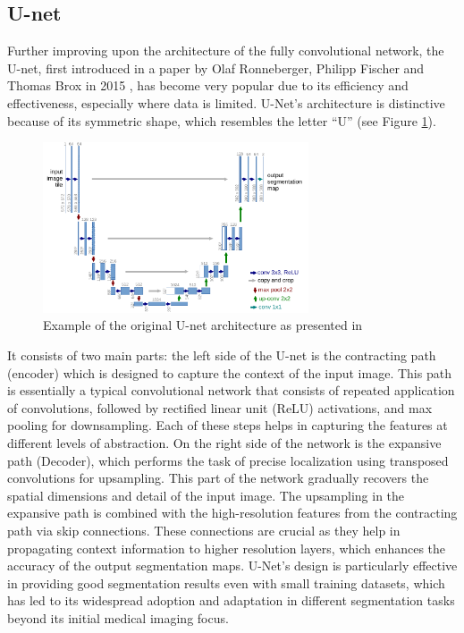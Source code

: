 \subsection{U-net}

Further improving upon the architecture of the fully convolutional network, the U-net, first introduced in a paper by Olaf Ronneberger, Philipp Fischer and Thomas Brox in 2015 \cite{DBLP:journals/corr/RonnebergerFB15}, has become very popular due to its efficiency and effectiveness, especially where data is limited. U-Net's architecture is distinctive because of its symmetric shape, which resembles the letter ``U'' (see Figure \ref{fig:u-netarch}). 
\begin{figure}
    \centering 
    \includegraphics[width=0.7\textwidth]{u-net-illustration-correct-scale2.pdf}
    \caption{Example of the original U-net architecture as presented in \cite{DBLP:journals/corr/RonnebergerFB15}}
    \label{fig:u-netarch}
\end{figure}
It consists of two main parts: the left side of the U-net is the contracting path (encoder) which is designed to capture the context of the input image. This path is essentially a typical convolutional network that consists of repeated application of convolutions, followed by rectified linear unit (ReLU) activations, and max pooling for downsampling. Each of these steps helps in capturing the features at different levels of abstraction. On the right side of the network is the expansive path (Decoder), which performs the task of precise localization using transposed convolutions for upsampling. This part of the network gradually recovers the spatial dimensions and detail of the input image. The upsampling in the expansive path is combined with the high-resolution features from the contracting path via skip connections. These connections are crucial as they help in propagating context information to higher resolution layers, which enhances the accuracy of the output segmentation maps. U-Net's design is particularly effective in providing good segmentation results even with small training datasets, which has led to its widespread adoption and adaptation in different segmentation tasks beyond its initial medical imaging focus.

